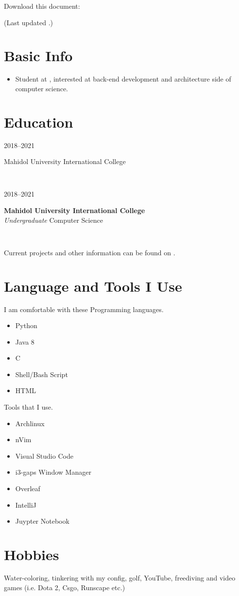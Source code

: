 \documentclass[letterpaper,
		10pt]{article}
\author{Vikrom Narula}
\date{\today}
\let\oldhref\href
\renewcommand{\href}[3][blue]{\oldhref{#2}{\color{#1}{#3}}}
\renewcommand{\maketitle}{
	\hspace{.25\textwidth}
	\begin{minipage}[t]{.5\textwidth}
\par{\centering{\Huge  \bfseries{\theauthor}}\par}
	\end{minipage}
	\begin{minipage}[t]{.25\textwidth}
{\footnotesize\hfill{}\color{gray}
\hfill{}Download this document:

\hfill{}\href[gray]{https://github.com/narula2000/latex-templates/blob/master/cv.pdf}{Here \pdf}

\hfill{}(Last updated \thedate.)
}
	\end{minipage}
}
\newcommand{\entry}[4]{
\ifthenelse{\isempty{#3}}
{\slimentry{#1}{#2}}{

\begin{minipage}[t]{.15\linewidth}
\hfill \textsc{#1}
\end{minipage}
\hfill\vline\hfill
\begin{minipage}[t]{.80\linewidth}
{\bf#2}\\\textit{#3} \footnotesize{#4}
\end{minipage}\\
\vspace{.2cm}
}}
\newcommand{\slimentry}[2]{

\begin{minipage}[t]{.15\linewidth}
\hfill \textsc{#1}
\end{minipage}
\hfill\vline\hfill
\begin{minipage}[t]{.80\linewidth}
#2
\end{minipage}\\
\vspace{.25cm}
}%
\begin{document}
\maketitle

\section{Basic Info}

\begin{itemize}
\item Student at \href{https://muic.mahidol.ac.th/eng/}{Mahidol University International College}, interested at back-end development and architecture side of computer science.
\end{itemize}

\section{Education}

\entry{2018--2021}
	{Mahidol University International College}
	{Undergraduate}
	{Computer Science}


Current projects and other information can be found on \href{https://github.com/narula2000}{Github \www}.

\section{Language  and Tools I Use}

I am comfortable with these Programming languages.
\begin{itemize}
	\item Python
	\item Java 8
	\item C
	\item Shell/Bash Script
	\item HTML
\end{itemize}
Tools that I use.
\begin{itemize}
	\item Archlinux
	\item nVim
	\item Visual Studio Code
	\item i3-gaps Window Manager
	\item Overleaf
	\item IntelliJ
	\item Juypter Notebook
\end{itemize}

\section{Hobbies}

Water-coloring, tinkering with my config, golf, YouTube, freediving and video games (i.e. Dota 2, Csgo, Runscape etc.)
\end{document}

